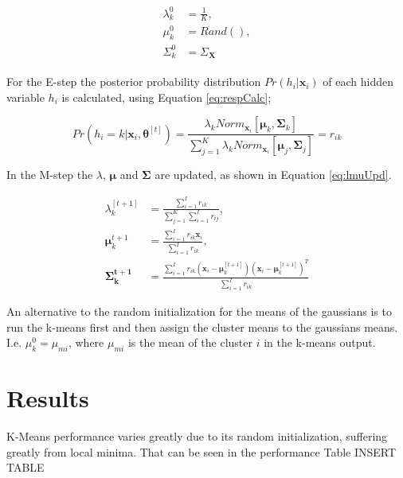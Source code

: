 \documentclass[12pt]{article}
\begin{document}
\begin{align}
\begin{split}
\label{eq:mixInit}
\lambda_k^0 &= \frac{1}{K},\\
\mu_k^0 &= Rand(),\\
\Sigma_k^0 &= \Sigma_{\mathbf{X}}
\end{split}
\end{align}

For the E-step the posterior probability distribution $Pr(h_i|\mathbf{x}_i)$ of each hidden variable $h_i$ is calculated, using Equation \ref{eq:respCalc};

\begin{equation}
\label{eq:respCalc}
Pr(h_i = k|\mathbf{x}_i, \boldsymbol{\theta}^{[t]}) = \frac{\lambda_k Norm_{\mathbf{x}_i} \left[ \boldsymbol{\mu}_k, \mathbf{\Sigma}_k \right] } { \sum_{j=1}^K \lambda_k Norm_{\mathbf{x}_i} \left[ \boldsymbol{\mu}_j, \mathbf{\Sigma}_j \right] } = r_{ik}
\end{equation}

In the M-step the $\lambda$, $\boldsymbol\mu$ and $\mathbf{\Sigma}$ are updated, as shown in Equation \ref{eq:lmuUpd}.

\begin{equation}
\begin{split}
\label{eq:lmuUpd}
\lambda_k^{[t+1]} &= \frac{\sum_{i=1}^I r_{ik}} {\sum_{j=1}^K \sum_{i=1}^I r_{ij}},\\
\boldsymbol \mu_k^{t+1} &= \frac{\sum_{i=1}^I r_{ik} \mathbf{x}_i}{\sum_{i=1}^Ir_{ik}},\\
\mathbf{\Sigma_k^{t+1}} &= \frac{\sum_{i=1}^I r_{ik} ( \mathbf{x}_i - \boldsymbol{\mu}_k^{[t+1]} ) ( \mathbf{x}_i - \boldsymbol{\mu}_k^{[t+1]} )^T } {\sum_{i=1}^Ir_{ik}}
\end{split}
\end{equation}

An alternative to the random initialization for the means of the gaussians is to run the k-means first and then assign the cluster means to the gaussians means.
I.e. $\mu^0_k = \mu_{mi}$, where $\mu_{mi}$ is the mean of the cluster $i$ in the k-means output. 

\section{Results}

K-Means performance varies greatly due to its random initialization, suffering greatly from local minima.
That can be seen in the performance Table INSERT TABLE
\end{document}
